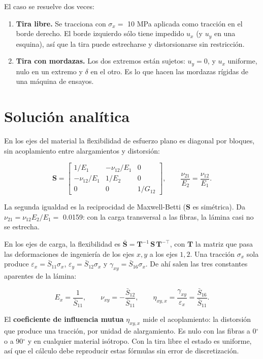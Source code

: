 \documentclass[11pt,oneside]{report}
\begin{document}
El caso se resuelve dos veces:

\begin{enumerate}
  \item \textbf{Tira libre.} Se tracciona con $\sigma_x =$ 10 MPa aplicada como tracción en el borde derecho. El borde izquierdo sólo tiene impedido $u_x$ (y $u_y$ en una esquina), así que la tira puede estrecharse y distorsionarse sin restricción.
  \item \textbf{Tira con mordazas.} Los dos extremos están sujetos: $u_y = 0$, y $u_x$ uniforme, nulo en un extremo y $\delta$ en el otro. Es lo que hacen las mordazas rígidas de una máquina de ensayos.
\end{enumerate}

\section{Solución analítica}

En los ejes del material la flexibilidad de esfuerzo plano es diagonal por bloques, sin acoplamiento entre alargamientos y distorsión:

\[
\mathbf S = \begin{bmatrix} 1/E_1 & -\nu_{12}/E_1 & 0 \\ -\nu_{12}/E_1 & 1/E_2 & 0 \\ 0 & 0 & 1/G_{12} \end{bmatrix},
\qquad
\frac{\nu_{21}}{E_2} = \frac{\nu_{12}}{E_1} .
\]

La segunda igualdad es la reciprocidad de Maxwell-Betti ($\mathbf S$ es simétrica). Da $\nu_{21} = \nu_{12}E_2/E_1 =$ 0.0159: con la carga transversal a las fibras, la lámina casi no se estrecha.

En los ejes de carga, la flexibilidad es $\bar{\mathbf S} = \mathbf T^{-1}\,\mathbf S\,\mathbf T^{-\top}$, con $\mathbf T$ la matriz que pasa las deformaciones de ingeniería de los ejes $x, y$ a los ejes $1, 2$. Una tracción $\sigma_x$ sola produce $\varepsilon_x = \bar S_{11}\sigma_x$, $\varepsilon_y = \bar S_{12}\sigma_x$ y $\gamma_{xy} = \bar S_{16}\sigma_x$. De ahí salen las tres constantes aparentes de la lámina:

\[
E_x = \frac{1}{\bar S_{11}}, \qquad
\nu_{xy} = -\frac{\bar S_{12}}{\bar S_{11}}, \qquad
\eta_{xy,x} = \frac{\gamma_{xy}}{\varepsilon_x} = \frac{\bar S_{16}}{\bar S_{11}} .
\]

El \textbf{coeficiente de influencia mutua} $\eta_{xy,x}$ mide el acoplamiento: la distorsión que produce una tracción, por unidad de alargamiento. Es nulo con las fibras a 0\ensuremath{^{\circ}} o a 90\ensuremath{^{\circ}} y en cualquier material isótropo. Con la tira libre el estado es uniforme, así que el cálculo debe reproducir estas fórmulas sin error de discretización.
\end{document}
